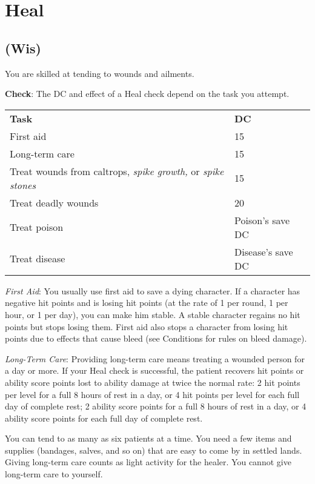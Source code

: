 \section{Heal}

\label{f0}
\subsection{(Wis)}

				
You are skilled at tending to wounds and ailments.
				
\textbf{Check}: The DC and effect of a Heal check depend on the task you attempt.
\begin{table}
 \begin{tabular}{ll}
\textbf{Task} & \textbf{DC}\\
First aid & 15\\
Long-term care & 15\\
Treat wounds from caltrops, \textit{spike growth,} or \textit{spike stones} & 15\\
Treat deadly wounds & 20\\
Treat poison & Poison's save DC\\
Treat disease & Disease's save DC\\
 \end{tabular}

\end{table}

				
\textit{First Aid}: You usually use first aid to save a dying character. If a character has negative hit points and is losing hit points (at the rate of 1 per round, 1 per hour, or 1 per day), you can make him stable. A stable character regains no hit points but stops losing them. First aid also stops a character from losing hit points due to effects that cause bleed (see Conditions for rules on bleed damage).
				
\textit{Long-Term Care}: Providing long-term care means treating a wounded person for a day or more. If your Heal check is successful, the patient recovers hit points or ability score points lost to ability damage at twice the normal rate: 2 hit points per level for a full 8 hours of rest in a day, or 4 hit points per level for each full day of complete rest; 2 ability score points for a full 8 hours of rest in a day, or 4 ability score points for each full day of complete rest.
				
You can tend to as many as six patients at a time. You need a few items and supplies (bandages, salves, and so on) that are easy to come by in settled lands. Giving long-term care counts as light activity for the healer. You cannot give long-term care to yourself.
				
